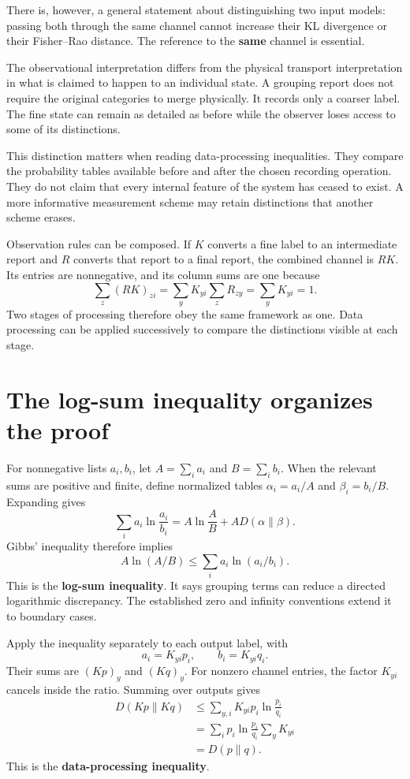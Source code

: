 \documentclass[11pt,oneside,openany]{book}
\theoremstyle{definition}
\theoremstyle{remark}
\numberwithin{equation}{chapter}
\begin{document}
There is, however, a general statement about distinguishing two input models: passing both through the same channel cannot increase their KL divergence or their Fisher--Rao distance. The reference to the \textbf{same} channel is essential.

The observational interpretation differs from the physical transport interpretation in what is claimed to happen to an individual state. A grouping report does not require the original categories to merge physically. It records only a coarser label. The fine state can remain as detailed as before while the observer loses access to some of its distinctions.

This distinction matters when reading data-processing inequalities. They compare the probability tables available before and after the chosen recording operation. They do not claim that every internal feature of the system has ceased to exist. A more informative measurement scheme may retain distinctions that another scheme erases.

Observation rules can be composed. If \(K\) converts a fine label to an intermediate report and \(R\) converts that report to a final report, the combined channel is \(RK\). Its entries are nonnegative, and its column sums are one because \[\sum_z(RK)_{zi}
=\sum_yK_{yi}\sum_zR_{zy}
=\sum_yK_{yi}=1.\] Two stages of processing therefore obey the same framework as one. Data processing can be applied successively to compare the distinctions visible at each stage.

\section{The log-sum inequality organizes the proof}\label{ch10-the-log-sum-inequality-organizes-the-proof}

For nonnegative lists \(a_i,b_i\), let \(A=\sum_i a_i\) and \(B=\sum_i b_i\). When the relevant sums are positive and finite, define normalized tables \(\alpha_i=a_i/A\) and \(\beta_i=b_i/B\). Expanding gives \[\sum_i a_i\ln\frac{a_i}{b_i}
=A\ln\frac AB+A D(\alpha\|\beta).\] Gibbs' inequality therefore implies \[\boxed{A\ln(A/B)\leq\sum_i a_i\ln(a_i/b_i).}\] This is the \textbf{log-sum inequality}. It says grouping terms can reduce a directed logarithmic discrepancy. The established zero and infinity conventions extend it to boundary cases.

Apply the inequality separately to each output label, with \[a_i=K_{yi}p_i,\qquad b_i=K_{yi}q_i.\] Their sums are \((Kp)_y\) and \((Kq)_y\). For nonzero channel entries, the factor \(K_{yi}\) cancels inside the ratio. Summing over outputs gives \[\begin{aligned}
D(Kp\|Kq)
&\leq\sum_{y,i}K_{yi}p_i\ln\frac{p_i}{q_i}\\
&=\sum_i p_i\ln\frac{p_i}{q_i}\sum_yK_{yi}\\
&=D(p\|q).
\end{aligned}\] This is the \textbf{data-processing inequality}.
\end{document}
